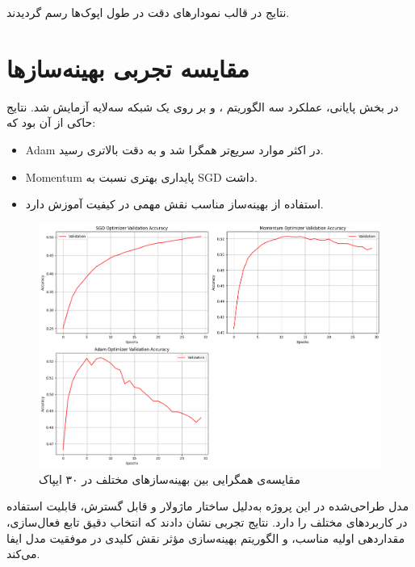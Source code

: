 	نتایج در قالب نمودارهای دقت در طول اپوک‌ها رسم گردیدند.
	
	\section*{مقایسه تجربی بهینه‌سازها}
	
	در بخش پایانی، عملکرد سه الگوریتم ،  و  بر روی یک شبکه سه‌لایه آزمایش شد. نتایج حاکی از آن بود که:
	
	\begin{itemize}
		\item Adam در اکثر موارد سریع‌تر همگرا شد و به دقت بالاتری رسید.
		\item Momentum پایداری بهتری نسبت به SGD داشت.
		\item استفاده از بهینه‌ساز مناسب نقش مهمی در کیفیت آموزش دارد.
	\end{itemize}
		
	\begin{figure}[h]
		\centering
		\includegraphics[width=0.7\linewidth]{images/task4-1}
		\caption{مقایسه‌ی همگرایی بین بهینه‌سازهای مختلف در ۳۰ ایپاک}
		\label{fig:task4-1}
	\end{figure}
	
	
	مدل طراحی‌شده در این پروژه به‌دلیل ساختار ماژولار و قابل گسترش، قابلیت استفاده در کاربردهای مختلف را دارد. نتایج تجربی نشان دادند که انتخاب دقیق تابع فعال‌سازی، مقداردهی اولیه مناسب، و الگوریتم بهینه‌سازی مؤثر نقش کلیدی در موفقیت مدل ایفا می‌کند.
	

